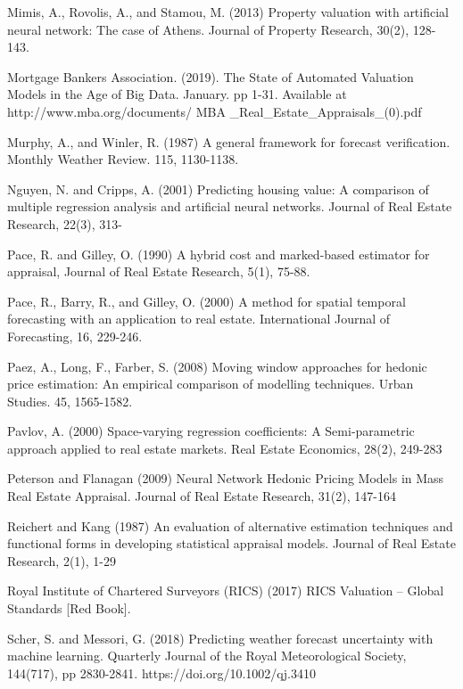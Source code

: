 \documentclass[colTwo]{anon}
\theoremstyle{definition}
\begin{document}
\begin{thebibliography}{50}
\harvarditem{}{}{}Mimis, A., Rovolis, A., and Stamou, M. (2013) Property valuation with artificial neural network: The case of Athens. Journal of Property Research, 30(2), 128-143. 

\harvarditem{}{}{}Mortgage Bankers Association. (2019). The State of Automated Valuation Models in the Age of Big Data. January. pp 1-31. Available at http://www.mba.org/documents/ MBA \_Real\_Estate\_Appraisals\_(0).pdf

\harvarditem{}{}{}Murphy, A., and Winler, R. (1987) A general framework for forecast verification. Monthly Weather Review. 115, 1130-1138.

\harvarditem{}{}{}Nguyen, N. and Cripps, A. (2001) Predicting housing value: A comparison of multiple regression analysis and artificial neural networks. Journal of Real Estate Research, 22(3), 313-

\harvarditem{}{}{}Pace, R. and Gilley, O. (1990) A hybrid cost and marked-based estimator for appraisal, Journal of Real Estate Research, 5(1), 75-88. 

\harvarditem{}{}{}Pace, R., Barry, R., and Gilley, O. (2000) A method for spatial temporal forecasting with an application to real estate.  International Journal of Forecasting, 16, 229-246. 

\harvarditem{}{}{}Paez, A., Long, F., Farber, S. (2008) Moving window approaches for hedonic price estimation: An empirical comparison of modelling techniques. Urban Studies. 45, 1565-1582. 

\harvarditem{}{}{}Pavlov, A. (2000) Space-varying regression coefficients: A Semi-parametric approach applied to real estate markets. Real Estate Economics, 28(2), 249-283

\harvarditem{}{}{}Peterson and Flanagan (2009) Neural Network Hedonic Pricing Models in Mass Real Estate Appraisal. Journal of Real Estate Research,  31(2), 147-164

\harvarditem{}{}{}Reichert and Kang (1987) An evaluation of alternative estimation techniques and functional forms in developing statistical appraisal models. Journal of Real Estate Research, 2(1), 1-29

\harvarditem{}{}{}Royal Institute of Chartered Surveyors (RICS) (2017) RICS Valuation – Global Standards [Red Book]. 

\harvarditem{}{}{}Scher, S. and Messori, G. (2018) Predicting weather forecast uncertainty with machine learning. Quarterly Journal of the Royal Meteorological Society, 144(717), pp 2830-2841.  https://doi.org/10.1002/qj.3410


\end{thebibliography}
\end{document}
